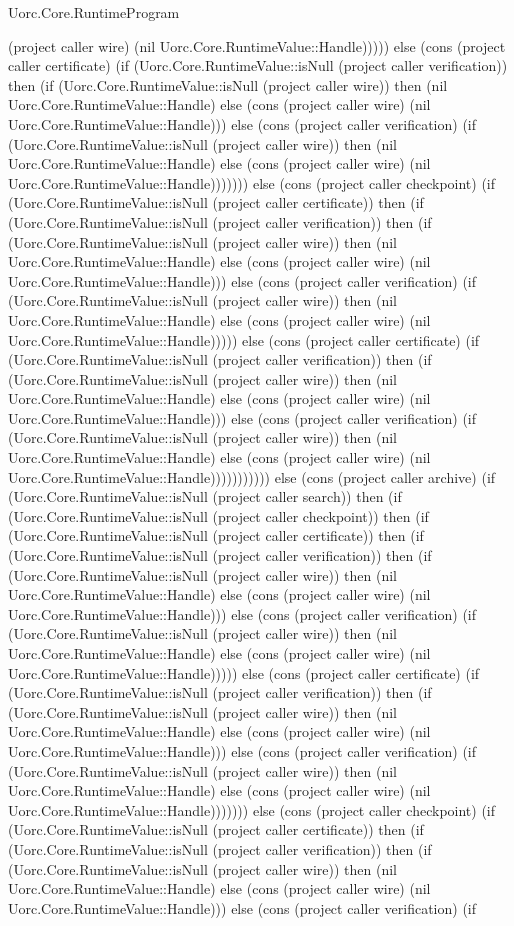 \begin{lexlean}{Uorc.Core.RuntimeProgram}
\begin{semanticmodule}
{(project caller wire) (nil Uorc.Core.RuntimeValue::Handle))))) else (cons (project caller certificate) (if (Uorc.Core.RuntimeValue::isNull (project caller verification)) then (if (Uorc.Core.RuntimeValue::isNull (project caller wire)) then (nil Uorc.Core.RuntimeValue::Handle) else (cons (project caller wire) (nil Uorc.Core.RuntimeValue::Handle))) else (cons (project caller verification) (if (Uorc.Core.RuntimeValue::isNull (project caller wire)) then (nil Uorc.Core.RuntimeValue::Handle) else (cons (project caller wire) (nil Uorc.Core.RuntimeValue::Handle))))))) else (cons (project caller checkpoint) (if (Uorc.Core.RuntimeValue::isNull (project caller certificate)) then (if (Uorc.Core.RuntimeValue::isNull (project caller verification)) then (if (Uorc.Core.RuntimeValue::isNull (project caller wire)) then (nil Uorc.Core.RuntimeValue::Handle) else (cons (project caller wire) (nil Uorc.Core.RuntimeValue::Handle))) else (cons (project caller verification) (if (Uorc.Core.RuntimeValue::isNull (project caller wire)) then (nil Uorc.Core.RuntimeValue::Handle) else (cons (project caller wire) (nil Uorc.Core.RuntimeValue::Handle))))) else (cons (project caller certificate) (if (Uorc.Core.RuntimeValue::isNull (project caller verification)) then (if (Uorc.Core.RuntimeValue::isNull (project caller wire)) then (nil Uorc.Core.RuntimeValue::Handle) else (cons (project caller wire) (nil Uorc.Core.RuntimeValue::Handle))) else (cons (project caller verification) (if (Uorc.Core.RuntimeValue::isNull (project caller wire)) then (nil Uorc.Core.RuntimeValue::Handle) else (cons (project caller wire) (nil Uorc.Core.RuntimeValue::Handle))))))))))) else (cons (project caller archive) (if (Uorc.Core.RuntimeValue::isNull (project caller search)) then (if (Uorc.Core.RuntimeValue::isNull (project caller checkpoint)) then (if (Uorc.Core.RuntimeValue::isNull (project caller certificate)) then (if (Uorc.Core.RuntimeValue::isNull (project caller verification)) then (if (Uorc.Core.RuntimeValue::isNull (project caller wire)) then (nil Uorc.Core.RuntimeValue::Handle) else (cons (project caller wire) (nil Uorc.Core.RuntimeValue::Handle))) else (cons (project caller verification) (if (Uorc.Core.RuntimeValue::isNull (project caller wire)) then (nil Uorc.Core.RuntimeValue::Handle) else (cons (project caller wire) (nil Uorc.Core.RuntimeValue::Handle))))) else (cons (project caller certificate) (if (Uorc.Core.RuntimeValue::isNull (project caller verification)) then (if (Uorc.Core.RuntimeValue::isNull (project caller wire)) then (nil Uorc.Core.RuntimeValue::Handle) else (cons (project caller wire) (nil Uorc.Core.RuntimeValue::Handle))) else (cons (project caller verification) (if (Uorc.Core.RuntimeValue::isNull (project caller wire)) then (nil Uorc.Core.RuntimeValue::Handle) else (cons (project caller wire) (nil Uorc.Core.RuntimeValue::Handle))))))) else (cons (project caller checkpoint) (if (Uorc.Core.RuntimeValue::isNull (project caller certificate)) then (if (Uorc.Core.RuntimeValue::isNull (project caller verification)) then (if (Uorc.Core.RuntimeValue::isNull (project caller wire)) then (nil Uorc.Core.RuntimeValue::Handle) else (cons (project caller wire) (nil Uorc.Core.RuntimeValue::Handle))) else (cons (project caller verification) (if }
\end{semanticmodule}
\end{lexlean}
